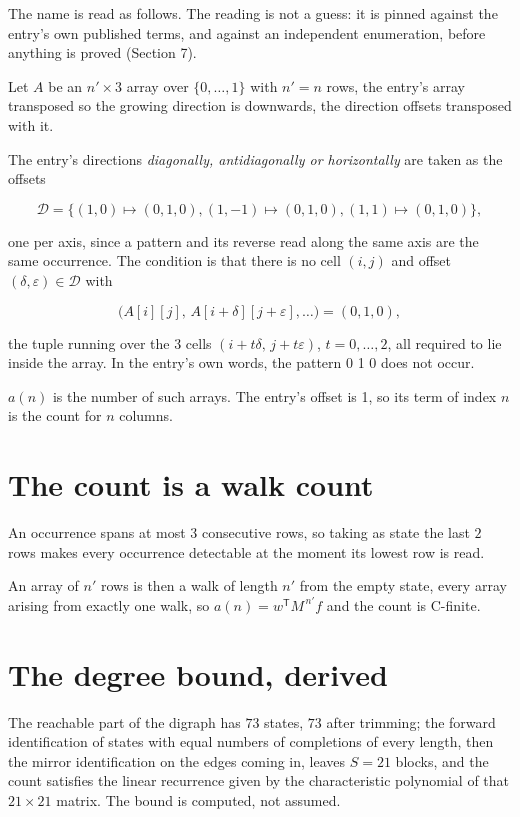 \documentclass[11pt]{article}
\theoremstyle{definition}
\begin{document}
The name is read as follows. The reading is not a guess: it is pinned against the entry's own published terms, and against an independent enumeration, before anything is proved (Section 7).

Let $A$ be an $n' \times 3$ array over $\{0,\dots,1\}$ with $n' = n$ rows, the entry's array transposed so the growing direction is downwards, the direction offsets transposed with it.

The entry's directions {\itshape diagonally, antidiagonally or horizontally} are taken as the offsets

\[\mathcal{D} = \{(1,0)\mapsto(0,1,0), (1,-1)\mapsto(0,1,0), (1,1)\mapsto(0,1,0)\},\]

one per axis, since a pattern and its reverse read along the same axis are the same occurrence. The condition is that there is no cell $(i,j)$ and offset $(\delta,\varepsilon)\in\mathcal{D}$ with

\[\bigl(A[i][j],\,A[i{+}\delta][j{+}\varepsilon],\dots\bigr) = (0, 1, 0),\]

the tuple running over the $3$ cells $(i+t\delta,\,j+t\varepsilon)$, $t = 0,\dots,2$, all required to lie inside the array. In the entry's own words, the pattern 0 1 0 does not occur.

$a(n)$ is the number of such arrays. The entry's offset is 1, so its term of index $n$ is the count for $n$ columns.

\section{The count is a walk count}

An occurrence spans at most $3$ consecutive rows, so taking as state the last $2$ rows makes every occurrence detectable at the moment its lowest row is read.

An array of $n'$ rows is then a walk of length $n'$ from the empty state, every array arising from exactly one walk, so $a(n) = w^{\mathsf T}M^{\,n'}f$ and the count is C-finite.

\section{The degree bound, derived}

The reachable part of the digraph has $73$ states, $73$ after trimming; the forward identification of states with equal numbers of completions of every length, then the mirror identification on the edges coming in, leaves $S = 21$ blocks, and the count satisfies the linear recurrence given by the characteristic polynomial of that $21\times21$ matrix. The bound is computed, not assumed.
\end{document}

